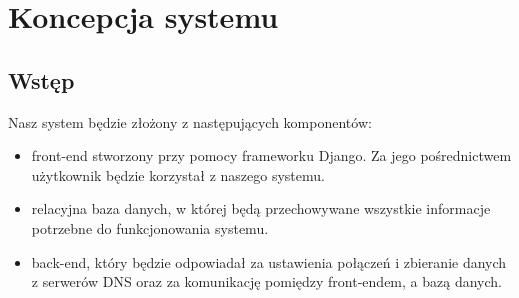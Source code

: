 \section{Koncepcja systemu}

\subsection{Wstęp}

\hspace{0.5cm} Nasz system będzie złożony z następujących komponentów:
\begin{itemize}
    \item front-end stworzony przy pomocy frameworku Django. Za jego pośrednictwem użytkownik będzie korzystał z naszego systemu.
    \item relacyjna baza danych, w której będą przechowywane wszystkie informacje potrzebne do funkcjonowania systemu.
    \item back-end, który będzie odpowiadał za ustawienia połączeń i zbieranie danych z serwerów DNS oraz za komunikację pomiędzy front-endem, a bazą danych.
\end{itemize}
